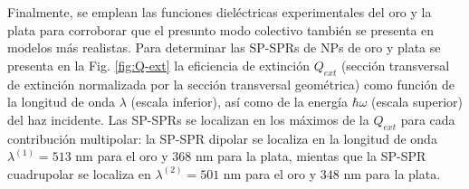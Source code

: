 Finalmente, se emplean las funciones dieléctricas experimentales del oro y la plata \cite{johnson1972constants} para corroborar que el presunto modo colectivo también se presenta en modelos más realistas. Para determinar las SP-SPRs de NPs de oro y plata se presenta en la Fig. \ref{fig:Q-ext} la eficiencia de extinción $Q_{ext}$ (sección transversal de extinción normalizada por la sección transversal geométrica) como función de la longitud de onda $\lambda$ (escala inferior), así como de la energía $\hbar\omega$ (escala superior) del haz incidente. Las SP-SPRs se localizan en los máximos de la $Q_{ext}$ para cada contribución multipolar: la SP-SPR dipolar se localiza en  la longitud de onda $\lambda^{(1)} = 513$ nm para el oro y $368$ nm para la plata, mientas que la SP-SPR cuadrupolar se localiza en $\lambda^{(2)} = 501$ nm para el oro y $348$ nm para la plata. %


